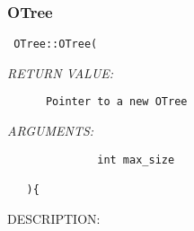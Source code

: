  
\setlength{\oldparskip}{\parskip}
\setlength{\parskip}{1.5ex}
\setlength{\oldparindent}{\parindent}
\setlength{\parindent}{0pt}
\setlength{\oldbaselineskip}{\baselineskip}
\setlength{\baselineskip}{11pt}
 
\def\bv{\begin{verbatim}}
\def\ev{\end{verbatim}}
\def\be{\begin{equation}}
\def\ee{\end{equation}}
\def\bea{\begin{eqnarray}}
\def\eea{\end{eqnarray}}
\def\bi{\begin{itemize}}
\def\ei{\end{itemize}}
\def\bn{\begin{enumerate}}
\def\en{\end{enumerate}}
\def\bd{\begin{description}}
\def\ed{\end{description}}
\def\({\left (}
\def\){\right )}
\def\[{\left [}
\def\]{\right ]}
\def\<{\left  \langle}
\def\>{\right \rangle}
\def\cI{{\cal I}}
\def\diag{\mathop{\rm diag}}
\def\tr{\mathop{\rm tr}}


 
\subsubsection [OTree] {OTree}


  
\begin{verbatim} OTree::OTree(\end{verbatim}{\em RETURN VALUE:}
\begin{verbatim}      Pointer to a new OTree\end{verbatim}{\em ARGUMENTS:}
\begin{verbatim} 
              int max_size
 
   ){\end{verbatim}
{\sf DESCRIPTION:\\ }


